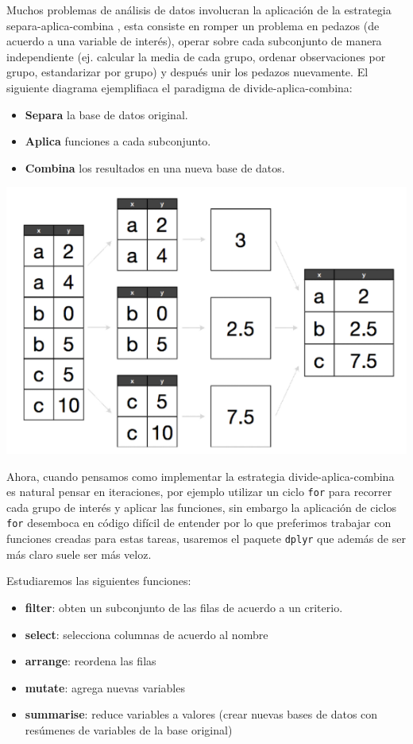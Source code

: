 \documentclass[
]{book}
\providecommand{\tightlist}{%
  \setlength{\itemsep}{0pt}\setlength{\parskip}{0pt}}
\begin{document}
Muchos problemas de análisis de datos involucran la aplicación de la estrategia
separa-aplica-combina \citep{plyr},
esta consiste en romper un problema en pedazos (de
acuerdo a una variable de interés), operar sobre cada subconjunto de manera
independiente (ej. calcular la media de cada grupo, ordenar observaciones por
grupo, estandarizar por grupo) y después unir los pedazos nuevamente. El
siguiente diagrama ejemplifiaca el paradigma de divide-aplica-combina:

\begin{itemize}
\tightlist
\item
  \textbf{Separa} la base de datos original.\\
\item
  \textbf{Aplica} funciones a cada subconjunto.\\
\item
  \textbf{Combina} los resultados en una nueva base de datos.
\end{itemize}

\includegraphics{imagenes/split-apply-combine.png}

Ahora, cuando pensamos como implementar la estrategia divide-aplica-combina es
natural pensar en iteraciones, por ejemplo utilizar un ciclo \texttt{for} para recorrer
cada grupo de interés y aplicar las funciones, sin embargo la aplicación de
ciclos \texttt{for} desemboca en código difícil de entender por lo que preferimos
trabajar con funciones creadas para estas tareas, usaremos el paquete
\texttt{dplyr} que además de ser más claro suele ser más veloz.

Estudiaremos las siguientes funciones:

\begin{itemize}
\tightlist
\item
  \textbf{filter}: obten un subconjunto de las filas de acuerdo a un criterio.
\item
  \textbf{select}: selecciona columnas de acuerdo al nombre
\item
  \textbf{arrange}: reordena las filas
\item
  \textbf{mutate}: agrega nuevas variables
\item
  \textbf{summarise}: reduce variables a valores (crear nuevas bases de datos con
  resúmenes de variables de la base original)
\end{itemize}
\end{document}
